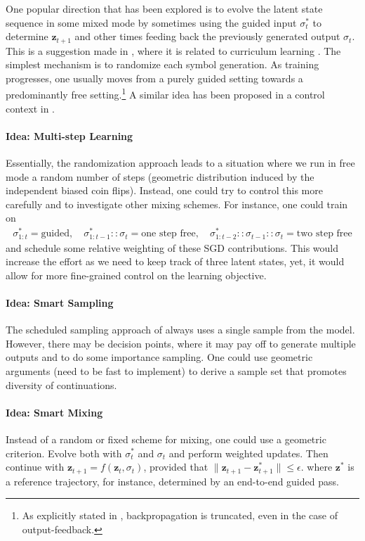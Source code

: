 \documentclass{article}
\newcommand{\z}{{\mathbf z}}
\begin{document}
One popular direction that has been explored is to evolve the latent state sequence in some mixed mode by sometimes using the guided input $\sigma^*_t$ to determine $\z_{t+1}$ and other times feeding back the previously generated output $\sigma_t$. This is a  suggestion made in \cite{bengio2015scheduled}, where it is related to curriculum learning \cite{bengio2009curriculum}. The simplest mechanism is to randomize each symbol generation. As training progresses, one usually moves from a purely guided setting towards a predominantly free setting.\footnote{As explicitly stated in \cite{bengio2015scheduled}, backpropagation is truncated, even in the case of output-feedback.} A similar idea has been proposed in a control context in \cite{venkatraman2015improving}.

\paragraph{Idea: Multi-step Learning} Essentially, the randomization approach leads to a situation where we run in free mode a random number of steps (geometric distribution induced by the independent biased coin flips). Instead, one could try to control this more carefully and to investigate other mixing schemes. For instance, one could train on
\begin{align}
\sigma^*_{1:t} = \text{guided}, \quad 
\sigma^*_{1:t-1} :: \sigma_t = \text{one step free}, \quad 
\sigma^*_{1:t-2} :: \sigma_{t-1}:: \sigma_t = \text{two step free}
\end{align}
and schedule some relative weighting of these SGD contributions. This would increase the effort as we need to keep track of three latent states, yet, it would allow for more fine-grained control on the learning objective. 

\paragraph{Idea: Smart Sampling} The scheduled sampling approach of  \cite{bengio2015scheduled} always uses a single sample from the model. However, there may be decision points, where it may pay off to generate multiple outputs and to do some importance sampling. One could use geometric arguments (need to be fast to implement) to derive a sample set that promotes diversity of continuations. 

\paragraph{Idea: Smart Mixing} Instead of a random or fixed scheme for mixing, one could use a geometric criterion. Evolve both with $\sigma^*_t$ and $\sigma_t$ and perform weighted updates. Then continue with $\z_{t+1}=f(\z_t, \sigma_{t})$, provided that $\| \z_{t+1} - \z_{t+1}^*\| \le \epsilon$. where $\z^*$ is a reference trajectory, for instance, determined by an end-to-end guided pass. 
\end{document}
